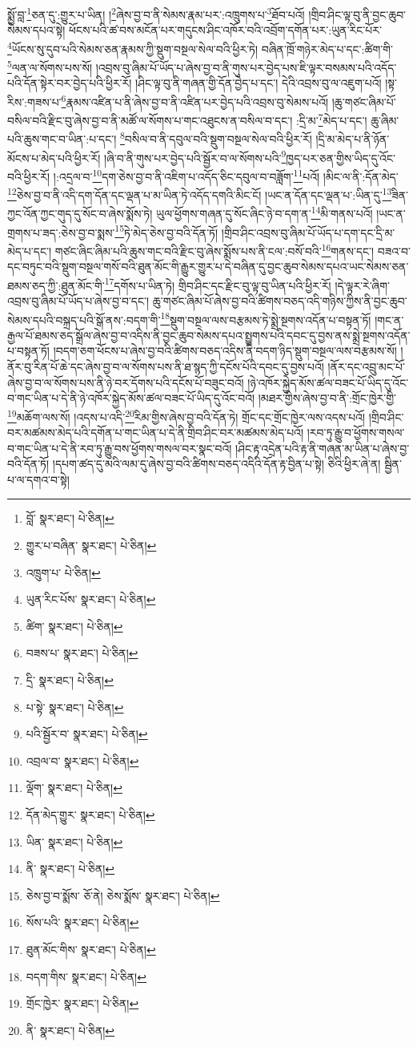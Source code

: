 སྨྱོ་བླ་\footnote{བློ་  སྣར་ཐང་།  པེ་ཅིན། }ཅན་དུ་:གྱུར་པ་ཡིན། །\footnote{གྱུར་པ་བཞིན་  སྣར་ཐང་།  པེ་ཅིན། }ཞེས་བྱ་བ་ནི་སེམས་རྣམ་པར་:འཁྲུགས་པ་\footnote{འཁྲུག་པ་  པེ་ཅིན། }ཐོབ་པའོ། །གྲིབ་ཤིང་ལྟ་བུ་ནི་བྱང་ཆུབ་སེམས་དཔའ་སྟེ། ཕོངས་པའི་ཚ་བས་མངོན་པར་གདུངས་ཤིང་འཁོར་བའི་འབྲོག་དགོན་པར་:ཡུན་རིང་པོར་\footnote{ཡུན་རིང་པོས་  སྣར་ཐང་།  པེ་ཅིན། }ཡོངས་སུ་དུབ་པའི་སེམས་ཅན་རྣམས་ཀྱི་སྡུག་བསྔལ་སེལ་བའི་ཕྱིར་ཏེ། བཞིན་ཁྲོ་གཉེར་མེད་པ་དང་:ཚིག་གི་\footnote{ཚིག་  སྣར་ཐང་།  པེ་ཅིན། }ལན་ལ་སོགས་པས་སོ། །འབྲས་བུ་ཞིམ་པོ་ཡོད་པ་ཞེས་བྱ་བ་ནི་གུས་པར་བྱེད་པས་ཇི་ལྟར་བསམས་པའི་འདོད་པའི་དོན་སྟེར་བར་བྱེད་པའི་ཕྱིར་རོ། །ཤིང་ལྟ་བུ་ནི་གཞན་གྱི་དོན་བྱེད་པ་དང་། དེའི་འབྲས་བུ་ལ་འཇུག་པའོ། །སྟ་རིས་:གཟས་པ་\footnote{བཟས་པ་  སྣར་ཐང་།  པེ་ཅིན། }རྣམས་འཛིན་པ་ནི་ཞེས་བྱ་བ་ནི་འཛིན་པར་བྱེད་པའི་འབྲས་བུ་སེམས་པའོ། །ཆུ་གཙང་ཞིམ་པོ་བསིལ་བའི་རྫིང་བུ་ཞེས་བྱ་བ་ནི་མཚོ་ལ་སོགས་པ་གང་འཐུངས་ན་བསིལ་བ་དང་། :དྲི་མ་\footnote{དྲི་  སྣར་ཐང་།  པེ་ཅིན། }མེད་པ་དང་། ཆུ་ཞིམ་པའི་ཆུས་གང་བ་ཡིན་:པ་དང་། \footnote{པ་སྟེ་  སྣར་ཐང་།  པེ་ཅིན། }བསིལ་བ་ནི་དབུལ་བའི་སྡུག་བསྔལ་སེལ་བའི་ཕྱིར་རོ། །དྲི་མ་མེད་པ་ནི་ཉོན་མོངས་པ་མེད་པའི་ཕྱིར་རོ། །ཞི་བ་ནི་གུས་པར་བྱེད་པའི་སྦྱོར་བ་ལ་སོགས་པའི་\footnote{པའི་སྦྱོར་བ་  སྣར་ཐང་།  པེ་ཅིན། }ཁྱད་པར་ཅན་གྱིས་ཡིད་དུ་འོང་བའི་ཕྱིར་རོ། །:འདྲལ་བ་\footnote{འབྲལ་བ་  སྣར་ཐང་།  པེ་ཅིན། }དག་ཅེས་བྱ་བ་ནི་འཇིག་པ་འདོད་ཅིང་དབུལ་བ་བཟློག་\footnote{ལྡོག་  སྣར་ཐང་།  པེ་ཅིན། }པའོ། །མིང་ལ་ནི་:དོན་མེད་\footnote{དོན་མེད་གྱུར་  སྣར་ཐང་།  པེ་ཅིན། }ཅེས་བྱ་བ་ནི་འདི་དག་དོན་དང་ལྡན་པ་མ་ཡིན་ཏེ་འདོད་དགའི་མིང་ངོ། །ཡང་ན་དོན་དང་ལྡན་པ་:ཡིན་དུ་\footnote{ཡིན་  སྣར་ཐང་།  པེ་ཅིན། }ཟིན་ཀྱང་འོན་ཀྱང་གུད་དུ་སོང་བ་ཞེས་སྨོས་ཏེ། ཡུལ་ཕྱོགས་གཞན་དུ་སོང་ཞིང་ཉེ་བ་དག་ན་\footnote{ནི་  སྣར་ཐང་།  པེ་ཅིན། }མི་གནས་པའོ། །ཡང་ན་གྲགས་པ་ཟད་:ཅེས་བྱ་བ་སྨས་\footnote{ཅེས་བྱ་བ་སྨོས་  ཅོ་ནེ། ཅེས་སྨོས་  སྣར་ཐང་།  པེ་ཅིན། }ཏེ་མེད་ཅེས་བྱ་བའི་དོན་ཏོ། །གྲིབ་ཤིང་འབྲས་བུ་ཞིམ་པོ་ཡོད་པ་དག་དང་དྲི་མ་མེད་པ་དང་། གཙང་ཞིང་ཞིམ་པའི་ཆུས་གང་བའི་རྫིང་བུ་ཞེས་སྨོས་པས་ནི་ངལ་:བསོ་བའི་\footnote{སོས་པའི་  སྣར་ཐང་།  པེ་ཅིན། }གནས་དང་། བཟའ་བ་དང་བཏུང་བའི་སྡུག་བསྔལ་གསོ་བའི་ཐུན་མོང་གི་རྒྱུར་གྱུར་པ་དེ་བཞིན་དུ་བྱང་ཆུབ་སེམས་དཔའ་ཡང་སེམས་ཅན་ཐམས་ཅད་ཀྱི་:ཐུན་མོང་གི་\footnote{ཐུན་མོང་གིས་  སྣར་ཐང་།  པེ་ཅིན། }དགོས་པ་ཡིན་ཏེ། གྲིབ་ཤིང་དང་རྫིང་བུ་ལྟ་བུ་ཡིན་པའི་ཕྱིར་རོ། །དེ་ལྟར་རེ་ཞིག་འབྲས་བུ་ཞིམ་པོ་ཡོད་པ་ཞེས་བྱ་བ་དང་། ཆུ་གཙང་ཞིམ་པོ་ཞེས་བྱ་བའི་ཚིགས་བཅད་འདི་གཉིས་ཀྱིས་ནི་བྱང་ཆུབ་སེམས་དཔའི་བསྐྲད་པའི་སྒོ་ནས་:བདག་གི་\footnote{བདག་གིས་  སྣར་ཐང་།  པེ་ཅིན། }སྡུག་བསྔལ་ལས་བརྩམས་ཏེ་སྨྲེ་སྔགས་འདོན་པ་བསྟན་ཏོ། །གང་ན་རྒྱལ་པོ་ཐམས་ཅད་སྒྲོལ་ཞེས་བྱ་བ་འདིས་ནི་བྱང་ཆུབ་སེམས་དཔའ་སྤྱུགས་པའི་དབང་དུ་བྱས་ནས་སྨྲེ་སྔགས་འདོན་པ་བསྟན་ཏོ། །བདག་ཅག་ཕོངས་པ་ཞེས་བྱ་བའི་ཚིགས་བཅད་འདིས་ནི་བདག་ཉིད་སྡུག་བསྔལ་ལས་བརྩམས་སོ། །ནོར་བུ་རིན་པོ་ཆེ་དང་ཞེས་བྱ་བ་ལ་སོགས་པས་ནི་ཐ་སྙད་ཀྱི་དངོས་པོའི་དབང་དུ་བྱས་པའོ། །ནོར་དང་འབྲུ་མང་པོ་ཞེས་བྱ་བ་ལ་སོགས་པས་ནི་ཉེ་བར་དོགས་པའི་དངོས་པོ་བཟུང་བའོ། །ཉེ་འཁོར་སྐྱེད་མོས་ཚལ་བཟང་པོ་ཡིད་དུ་འོང་བ་གང་ཡིན་པ་དེ་ནི་ཉེ་འཁོར་སྐྱེད་མོས་ཚལ་བཟང་པོ་ཡིད་དུ་འོང་བའོ། །མཐར་གྱིས་ཞེས་བྱ་བ་ནི་:གྲོང་ཁྱེར་གྱི་\footnote{གྲོང་ཁྱེར་  སྣར་ཐང་།  པེ་ཅིན། }མཆོག་ལས་སོ། །འདས་པ་འདི་\footnote{ནི་  སྣར་ཐང་།  པེ་ཅིན། }རིམ་གྱིས་ཞེས་བྱ་བའི་དོན་ཏེ། གྲོང་དང་གྲོང་ཁྱེར་ལས་འདས་པའོ། །གྲིབ་ཤིང་བར་མཚམས་མེད་པའི་དགོན་པ་གང་ཡིན་པ་དེ་ནི་གྲིབ་ཤིང་བར་མཚམས་མེད་པའོ། །རབ་ཏུ་རྒྱུ་བ་ཕྱོགས་གསལ་བ་གང་ཡིན་པ་དེ་ནི་རབ་ཏུ་རྒྱུ་བས་ཕྱོགས་གསལ་བར་སྣང་བའོ། །ཤིང་རྟ་འདྲེན་པའི་རྟ་ནི་གཞན་མ་ཡིན་པ་ཞེས་བྱ་བའི་དོན་ཏོ། །དཔག་ཚད་དུ་མའི་ལམ་དུ་ཞེས་བྱ་བའི་ཚིགས་བཅད་འདིའི་དོན་རྟ་བྱིན་པ་སྟེ། ཅིའི་ཕྱིར་ཞེ་ན། སྦྱིན་པ་ལ་དགའ་བ་སྟེ། 